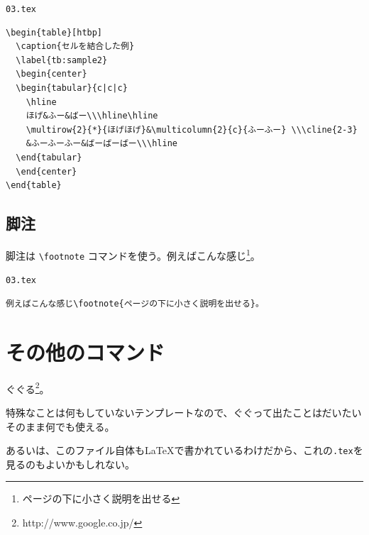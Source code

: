 \begin{itembox}[l]{{\tt 03.tex}}
\begin{verbatim}
\begin{table}[htbp]
  \caption{セルを結合した例}
  \label{tb:sample2}
  \begin{center}
  \begin{tabular}{c|c|c}
    \hline
    ほげ&ふー&ばー\\\hline\hline
    \multirow{2}{*}{ほげほげ}&\multicolumn{2}{c}{ふーふー} \\\cline{2-3}
    &ふーふーふー&ばーばーばー\\\hline
  \end{tabular}
  \end{center}
\end{table}
\end{verbatim}
\end{itembox}


\subsection{脚注}

脚注は \verb|\footnote| コマンドを使う。例えばこんな感じ\footnote{ページの下に小さく説明を出せる}。

\begin{itembox}[l]{{\tt 03.tex}}
\begin{verbatim}
例えばこんな感じ\footnote{ページの下に小さく説明を出せる}。
\end{verbatim}
\end{itembox}

\section{その他のコマンド}

ぐぐる\footnote{http://www.google.co.jp/}。

特殊なことは何もしていないテンプレートなので、ぐぐって出たことはだいたいそのまま何でも使える。

あるいは、このファイル自体も\LaTeX で書かれているわけだから、これの{\tt *.tex}を見るのもよいかもしれない。


